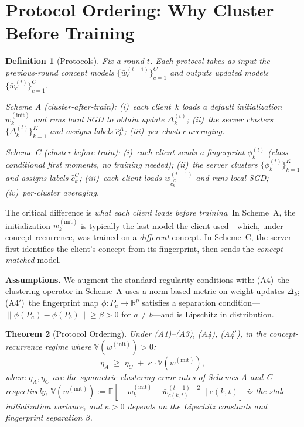 \documentclass[11pt]{article}
\newcommand{\E}{\mathbb{E}}
\newcommand{\R}{\mathbb{R}}
\newcommand{\V}{\mathbb{V}}
\newcommand{\wbar}{\bar{w}}
\newtheorem{theorem}{Theorem}
\newtheorem{definition}[theorem]{Definition}
\begin{document}
\section{Protocol Ordering: Why Cluster Before Training}
\label{sec:protocol}

\begin{definition}[Protocols]
\label{def:protocols}
Fix a round $t$. Each protocol takes as input the previous-round concept models $\{\wbar_c^{(t-1)}\}_{c=1}^C$ and outputs updated models $\{\wbar_c^{(t)}\}_{c=1}^C$.

\emph{Scheme A} (cluster-after-train): (i)~each client~$k$ loads a default initialization $w_k^{(\mathrm{init})}$ and runs local SGD to obtain update $\Delta_k^{(t)}$; (ii)~the server clusters $\{\Delta_k^{(t)}\}_{k=1}^K$ and assigns labels $\hat c_k^A$; (iii)~per-cluster averaging.

\emph{Scheme C} (cluster-before-train): (i)~each client sends a fingerprint $\phi_k^{(t)}$ (class-conditional first moments, no training needed); (ii)~the server clusters $\{\phi_k^{(t)}\}_{k=1}^K$ and assigns labels $\hat c_k^C$; (iii)~each client loads $\wbar_{\hat c_k^C}^{(t-1)}$ and runs local SGD; (iv)~per-cluster averaging.
\end{definition}

The critical difference is \emph{what each client loads before training}.
In Scheme~A, the initialization $w_k^{(\mathrm{init})}$ is typically the last model the client used---which, under concept recurrence, was trained on a \emph{different} concept.
In Scheme~C, the server first identifies the client's concept from its fingerprint, then sends the \emph{concept-matched} model.

\textbf{Assumptions.}
We augment the standard regularity conditions with:
(A4)~the clustering operator in Scheme~A uses a norm-based metric on weight updates $\Delta_k$;
(A4$'$)~the fingerprint map $\phi: P_c \mapsto \R^p$ satisfies a separation condition---$\|\phi(P_a) - \phi(P_b)\| \ge \beta > 0$ for $a \ne b$---and is Lipschitz in distribution.

\begin{theorem}[Protocol Ordering]
\label{thm:protocol}
Under (A1)--(A3), (A4), (A4$'$), in the concept-recurrence regime where $\V(w^{(\mathrm{init})}) > 0$:
\begin{equation}
\eta_A \;\ge\; \eta_C \;+\; \kappa \cdot \V(w^{(\mathrm{init})}),
\label{eq:protocol}
\end{equation}
where $\eta_A, \eta_C$ are the symmetric clustering-error rates of Schemes A and C respectively, $\V(w^{(\mathrm{init})}) := \E[\|w_k^{(\mathrm{init})} - \wbar_{c(k,t)}^{(t-1)}\|^2 \mid c(k,t)]$ is the stale-initialization variance, and $\kappa > 0$ depends on the Lipschitz constants and fingerprint separation $\beta$.
\end{theorem}
\end{document}
